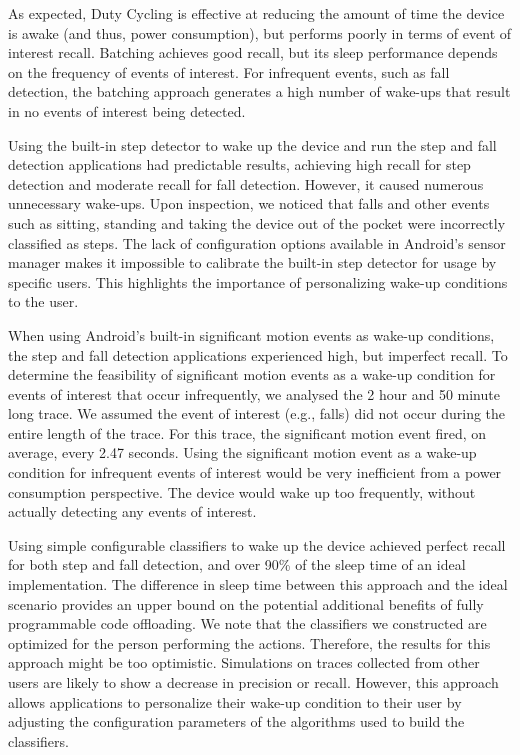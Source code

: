 As expected, Duty Cycling is effective at reducing the amount of time
the device is awake (and thus, power consumption), but performs poorly
in terms of event of interest recall.  Batching achieves
good recall, but its sleep performance depends on the frequency of
events of interest.  For infrequent events, such as fall
detection, the batching approach generates a high number 
of wake-ups that result in no events of interest being detected.

Using the built-in step detector to wake up the device and run the step 
and fall detection applications had predictable results, achieving high
recall for step detection and moderate recall for fall detection. However,
it caused numerous unnecessary wake-ups.  Upon inspection, we noticed that 
falls and other events such as sitting, standing and taking the device 
out of the pocket were incorrectly classified as steps.  The lack of 
configuration options available in Android's sensor manager makes it 
impossible to calibrate the built-in step detector for usage by specific 
users.  This highlights the importance of personalizing wake-up
conditions to the user.

When using Android's built-in significant motion events as wake-up 
conditions, the step and fall detection applications experienced high, but
imperfect recall.  To determine the feasibility of significant motion events 
as a wake-up condition for events of interest that occur infrequently, we 
analysed the 2 hour and 50 minute long trace.  We assumed the event of 
interest (e.g., falls) did not occur during the entire length of the 
trace.  For this trace, the significant motion event fired, on average, 
every 2.47 seconds.  Using the significant motion event as a wake-up 
condition for infrequent events of interest would be very inefficient from a 
power consumption perspective.  The device would wake up too
frequently, without actually detecting any events of interest.


Using simple configurable classifiers to wake up the device achieved perfect recall 
for both step and fall detection, and 
over 90\% of the sleep time of an ideal implementation.  The
difference in sleep time between this approach and the ideal scenario 
provides an upper bound on the potential additional benefits of fully
programmable code offloading.  We note that the classifiers we constructed 
are optimized for the person performing the actions.  Therefore, the
results for this approach might be too optimistic.  Simulations on traces 
collected from other users are likely to show a decrease in precision or 
recall.  However, this approach allows applications to personalize their 
wake-up condition to their user by adjusting the configuration parameters 
of the algorithms used to build the classifiers.






 